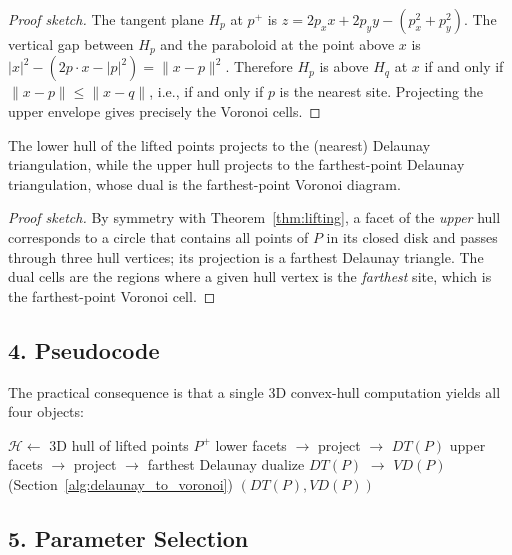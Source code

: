 \begin{proof}[Proof sketch]
The tangent plane $H_p$ at $p^+$ is $z = 2p_x x + 2p_y y - (p_x^2 + p_y^2)$. The
vertical gap between $H_p$ and the paraboloid at the point above $x$ is
$|x|^2 - (2p \cdot x - |p|^2) = \|x - p\|^2$. Therefore $H_p$ is above $H_q$ at
$x$ if and only if $\|x - p\| \le \|x - q\|$, i.e., if and only if $p$ is the
nearest site. Projecting the upper envelope gives precisely the Voronoi cells.
\end{proof}

\begin{theorem}\label{thm:farthest_hull}
The lower hull of the lifted points projects to the (nearest) Delaunay
triangulation, while the upper hull projects to the farthest-point Delaunay
triangulation, whose dual is the farthest-point Voronoi diagram.
\end{theorem}

\begin{proof}[Proof sketch]
By symmetry with Theorem~\ref{thm:lifting}, a facet of the \emph{upper} hull
corresponds to a circle that contains all points of $P$ in its closed disk and
passes through three hull vertices; its projection is a farthest Delaunay
triangle. The dual cells are the regions where a given hull vertex is the
\emph{farthest} site, which is the farthest-point Voronoi cell.
\end{proof}

\subsection{4. Pseudocode}

The practical consequence is that a single 3D convex-hull computation yields
all four objects:

\begin{algorithm}[htbp]
\caption{All Diagrams from One Convex Hull}
\label{alg:hull_diagrams}
\begin{algorithmic}[1]
  \State $\mathcal{H} \gets $ 3D hull of lifted points $P^+$
  \State lower facets $\to$ project $\to$ $DT(P)$
  \State upper facets $\to$ project $\to$ farthest Delaunay
  \State dualize $DT(P)$ $\to$ $VD(P)$ (Section~\ref{alg:delaunay_to_voronoi})
  \State \Return $(DT(P), VD(P))$
\EndFunction
\end{algorithmic}
\end{algorithm}

\subsection{5. Parameter Selection}

